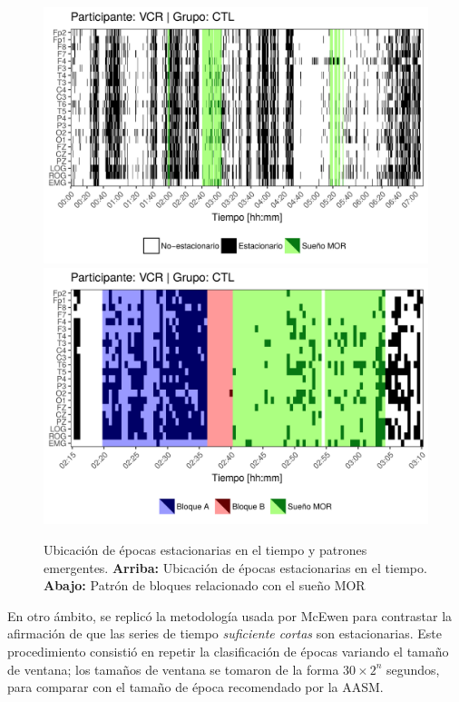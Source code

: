 \begin{figure}
\centering
\includegraphics[width=.9\textwidth]
{./img_art_dfa/zoom_noVCR_v2.png} \\
\includegraphics[width=.9\textwidth]
{./img_art_dfa/zoom_siVCR_v2.png}
\caption[Ubicación de épocas estacionarias en el tiempo y patrones emergentes]
{Ubicación de épocas estacionarias en el tiempo y patrones emergentes. \textbf{Arriba:} 
Ubicación de épocas estacionarias en el tiempo.
\textbf{Abajo:} Patrón de bloques relacionado con el sueño MOR}
\label{patroncito}
\end{figure}


En otro ámbito,
se replicó la metodología usada por McEwen \cite{McEwen75} para contrastar la afirmación
de que las series de tiempo \textit{suficiente cortas} son estacionarias. 
Este procedimiento consistió en repetir la clasificación de épocas variando el 
tamaño de ventana; los tamaños de ventana se tomaron de la forma $30 \times 2^{n}$ segundos, 
para comparar con el tamaño de época recomendado por la AASM.%


